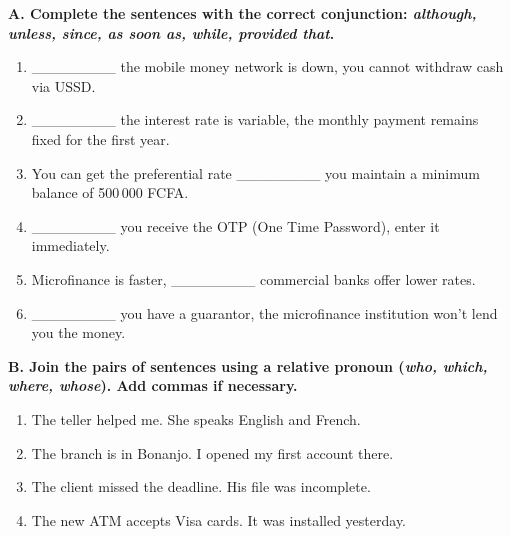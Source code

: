 \documentclass[11pt]{article}
\begin{document}
\begin{exercice}
\textbf{A. Complete the sentences with the correct conjunction: \textit{although, unless, since, as soon as, while, provided that}.}
\begin{enumerate}
    \item \_\_\_\_\_\_\_\_ the mobile money network is down, you cannot withdraw cash via USSD.
    \item \_\_\_\_\_\_\_\_ the interest rate is variable, the monthly payment remains fixed for the first year.
    \item You can get the preferential rate \_\_\_\_\_\_\_\_ you maintain a minimum balance of 500\,000 FCFA.
    \item \_\_\_\_\_\_\_\_ you receive the OTP (One Time Password), enter it immediately.
    \item Microfinance is faster, \_\_\_\_\_\_\_\_ commercial banks offer lower rates.
    \item \_\_\_\_\_\_\_\_ you have a guarantor, the microfinance institution won't lend you the money.
\end{enumerate}

\textbf{B. Join the pairs of sentences using a relative pronoun (\textit{who, which, where, whose}). Add commas if necessary.}
\begin{enumerate}
    \item The teller helped me. She speaks English and French.
    \item The branch is in Bonanjo. I opened my first account there.
    \item The client missed the deadline. His file was incomplete.
    \item The new ATM accepts Visa cards. It was installed yesterday.
\end{enumerate}
\end{exercice}
\end{document}
